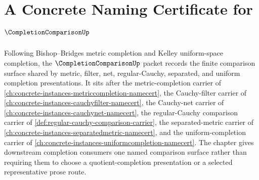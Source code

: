 \chapter{A Concrete Naming Certificate for $\CompletionComparisonUp$}
\label{ch:concrete-instances-completion-comparison-namecert}

Following Bishop--Bridges metric completion and Kelley uniform-space completion, the $\CompletionComparisonUp$ packet records the finite comparison surface shared by metric, filter, net, regular-Cauchy, separated, and uniform completion presentations. It sits after the metric-completion carrier of \autoref{ch:concrete-instances-metriccompletion-namecert}, the Cauchy-filter carrier of \autoref{ch:concrete-instances-cauchyfilter-namecert}, the Cauchy-net carrier of \autoref{ch:concrete-instances-cauchynet-namecert}, the regular-Cauchy comparison carrier of \autoref{def:regular-cauchy-comparison-carrier}, the separated-metric carrier of \autoref{ch:concrete-instances-separatedmetric-namecert}, and the uniform-completion carrier of \autoref{ch:concrete-instances-uniformcompletion-namecert}. The chapter gives downstream completion consumers one named comparison surface rather than requiring them to choose a quotient-completion presentation or a selected representative prose route.


